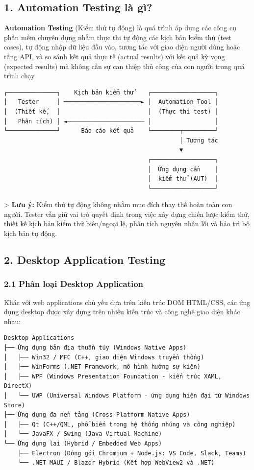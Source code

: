 \subsection{1. Automation Testing là gì?}

\textbf{Automation Testing} (Kiểm thử tự động) là quá trình áp dụng các công cụ phần mềm chuyên dụng nhằm thực thi tự động các kịch bản kiểm thử (test cases), tự động nhập dữ liệu đầu vào, tương tác với giao diện người dùng hoặc tầng API, và so sánh kết quả thực tế (actual results) với kết quả kỳ vọng (expected results) mà không cần sự can thiệp thủ công của con người trong quá trình chạy.

\begin{lstlisting}
┌──────────────┐    Kịch bản kiểm thử    ┌──────────────────┐
│   Tester     │ ──────────────────────► │  Automation Tool │
│  (Thiết kế,  │                         │  (Thực thi test) │
│   Phân tích) │ ◄────────────────────── │                  │
└──────────────┘      Báo cáo kết quả    └────────┬─────────┘
                                                  │ Tương tác
                                                  ▼
                                         ┌──────────────────┐
                                         │  Ứng dụng cần    │
                                         │  kiểm thử (AUT)  │
                                         └──────────────────┘
\end{lstlisting}


> \textbf{Lưu ý:} Kiểm thử tự động không nhằm mục đích thay thế hoàn toàn con người. Tester vẫn giữ vai trò quyết định trong việc xây dựng chiến lược kiểm thử, thiết kế kịch bản kiểm thử biên/ngoại lệ, phân tích nguyên nhân lỗi và bảo trì bộ kịch bản tự động.


\subsection{2. Desktop Application Testing}

\subsubsection{2.1 Phân loại Desktop Application}

Khác với web applications chủ yếu dựa trên kiến trúc DOM HTML/CSS, các ứng dụng desktop được xây dựng trên nhiều kiến trúc và công nghệ giao diện khác nhau:

\begin{lstlisting}
Desktop Applications
├── Ứng dụng bản địa thuần túy (Windows Native Apps)
│   ├── Win32 / MFC (C++, giao diện Windows truyền thống)
│   ├── WinForms (.NET Framework, mô hình hướng sự kiện)
│   ├── WPF (Windows Presentation Foundation - kiến trúc XAML, DirectX)
│   └── UWP (Universal Windows Platform - ứng dụng hiện đại từ Windows Store)
├── Ứng dụng đa nền tảng (Cross-Platform Native Apps)
│   ├── Qt (C++/QML, phổ biến trong hệ thống nhúng và công nghiệp)
│   └── JavaFX / Swing (Java Virtual Machine)
└── Ứng dụng lai (Hybrid / Embedded Web Apps)
    ├── Electron (Đóng gói Chromium + Node.js: VS Code, Slack, Teams)
    └── .NET MAUI / Blazor Hybrid (Kết hợp WebView2 và .NET)
\end{lstlisting}


